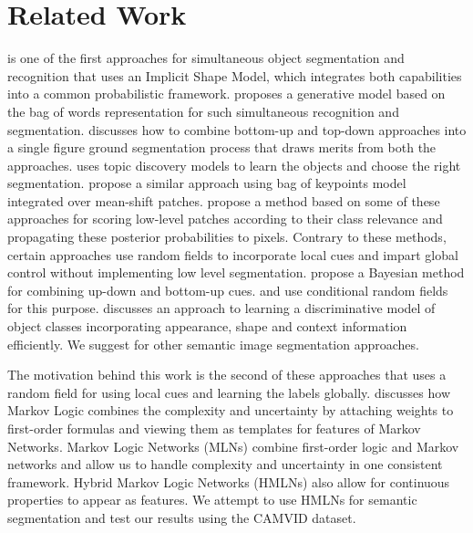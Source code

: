 \documentclass{article} %
\begin{document}

\section{Related Work}
\label{sec:Related}

\cite{Leibe04combinedobject} is one of the first approaches for simultaneous object segmentation and recognition that uses an Implicit Shape Model, which integrates both capabilities into a common probabilistic framework. \cite{cao:spatially} proposes a generative model based on the bag of words representation for such simultaneous recognition and segmentation. \cite{Borenstein04combiningtop} discusses how to combine bottom-up and top-down approaches into a single figure ground segmentation process that draws merits from both the approaches. \cite{Russell:2006:UMS:1153171.1153637} uses topic discovery models to learn the objects and choose the right segmentation. \cite{lin07multiple} propose a similar approach using bag of keypoints model integrated over mean-shift patches. \cite{conf/bmvc/CsurkaP08} propose a method based on some of these approaches for scoring low-level patches according to their class relevance and propagating these posterior probabilities to pixels. Contrary to these methods, certain approaches use random fields to incorporate local cues and impart global control without implementing low level segmentation. \cite{Kumar:2005:OC:1068507.1068889} propose a Bayesian method for combining up-down and bottom-up cues. \cite{Richard04multiscaleconditional} and \cite{Kumar:2005:HFF:1097115.1097790} use conditional random fields for this purpose. \cite{Shotton06textonboost:joint} discusses an approach to learning a discriminative model of object classes incorporating appearance, shape and context information efficiently. We suggest \cite{SegmentRegionsParts} for other semantic image segmentation approaches.

The motivation behind this work is the second of these approaches that uses a random field for using local cues and learning the labels globally. \cite{Domingos06unifyinglogical} discusses how Markov Logic combines the complexity and uncertainty by attaching weights to first-order formulas and viewing them as templates for features of Markov Networks. Markov Logic Networks (MLNs) \cite{Richardson06markovlogic} combine first-order logic and Markov networks and allow us to handle complexity and uncertainty in one consistent framework. Hybrid Markov Logic Networks (HMLNs)\cite{Wang_hybridmarkov} also allow for continuous properties to appear as features. We attempt to use HMLNs for semantic segmentation and test our results using the CAMVID dataset. 
\end{document}
